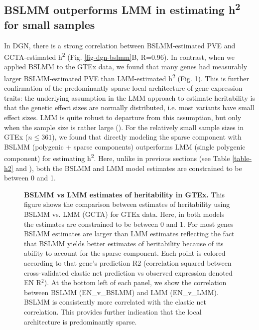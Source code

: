 \documentclass[10pt,letterpaper]{article}
\begin{document}
\subsection*{BSLMM outperforms LMM in estimating h\textsuperscript{2}  for small samples}

In DGN, there is a strong correlation between BSLMM-estimated PVE and GCTA-estimated h\textsuperscript{2} (Fig. \ref{fig-dgn-bslmm}B, R=0.96). In contrast, when we applied BSLMM to the GTEx data, we found that many genes had measurably larger BSLMM-estimated PVE than LMM-estimated h\textsuperscript{2} (Fig. \ref{fig-gtex-pve-h2}). This is further confirmation of the predominantly sparse local architecture of gene expression traits: the underlying assumption in the LMM approach to estimate heritability is that the genetic effect sizes are normally distributed, i.e. most variants have small effect sizes. LMM is quite robust to departure from this assumption, but only when the sample size is rather large (). For the relatively small sample sizes in GTEx (\(n \leq 361\)), we found that directly modeling the sparse component with BSLMM (polygenic + sparse components) outperforms LMM (single polygenic component) for estimating h\textsuperscript{2}. Here, unlike in previous sections (see Table \ref{table-h2} and ), both the BSLMM and LMM model estimates are constrained to be between 0 and 1. 

\begin{figure}[H]
\caption{{\bf BSLMM vs LMM estimates of heritability in GTEx.} 
This figure shows the comparison between estimates of heritability using BSLMM vs. LMM (GCTA) for GTEx data. Here, in both models the estimates are constrained to be between 0 and 1. For most genes BSLMM estimates are larger than LMM estimates reflecting the fact that BSLMM yields better estimates of heritability because of its ability to account for the sparse component. Each point is colored according to that gene's prediction R2 (correlation squared between cross-validated elastic net prediction vs observed expression denoted EN R$^2$). At the bottom left of each panel, we show the correlation between BSLMM (EN\_v\_BSLMM) and LMM (EN\_v\_LMM). BSLMM is consistently more correlated with the elastic net correlation. This provides further indication that the local architecture is predominantly sparse.}
\label{fig-gtex-pve-h2}
\end{figure}
\end{document}
